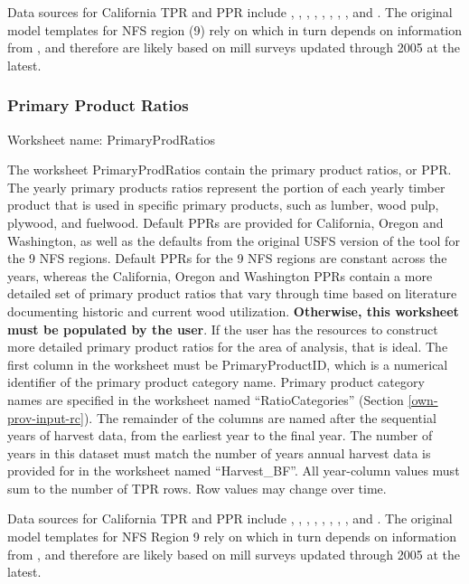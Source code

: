 \documentclass[
  openany]{book}
\begin{document}
Data sources for California TPR and PPR include \textcite{barrette1970}, \textcite{hiserote1978}, \textcite{howard1974}, \textcite{marcille2020}, \textcite{mciver2015}, \textcite{morgan2004}, \textcite{morgan2012}, \textcite{ward1995}, and \textcite{ward1997}. The original model templates for NFS region (9) rely on \textcite{smith2006} which in turn depends on information from \textcite{adams2006}, and therefore are likely based on mill surveys updated through 2005 at the latest.

\hypertarget{own-prov-input-ppr}{%
\subsubsection{Primary Product Ratios}\label{own-prov-input-ppr}}

Worksheet name: PrimaryProdRatios

The worksheet PrimaryProdRatios contain the primary product ratios, or PPR. The yearly primary products ratios represent the portion of each yearly timber product that is used in specific primary products, such as lumber, wood pulp, plywood, and fuelwood. Default PPRs are provided for California, Oregon and Washington, as well as the defaults from the original USFS version of the tool for the 9 NFS regions. Default PPRs for the 9 NFS regions are constant across the years, whereas the California, Oregon and Washington PPRs contain a more detailed set of primary product ratios that vary through time based on literature documenting historic and current wood utilization. \textbf{Otherwise, this worksheet must be populated by the user}. If the user has the resources to construct more detailed primary product ratios for the area of analysis, that is ideal. The first column in the worksheet must be PrimaryProductID, which is a numerical identifier of the primary product category name. Primary product category names are specified in the worksheet named ``RatioCategories'' (Section \ref{own-prov-input-rc}). The remainder of the columns are named after the sequential years of harvest data, from the earliest year to the final year. The number of years in this dataset must match the number of years annual harvest data is provided for in the worksheet named ``Harvest\_BF''. All year-column values must sum to the number of TPR rows. Row values may change over time.

Data sources for California TPR and PPR include \textcite{barrette1970}, \textcite{hiserote1978}, \textcite{howard1974}, \textcite{marcille2020}, \textcite{mciver2015}, \textcite{morgan2004}, \textcite{morgan2012}, \textcite{ward1995}, and \textcite{ward1997}. The original model templates for NFS Region 9 rely on \textcite{smith2006} which in turn depends on information from \textcite{adams2006}, and therefore are likely based on mill surveys updated through 2005 at the latest.
\end{document}
